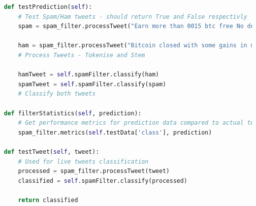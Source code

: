 \documentclass[oneside, 12pt]{article}
\begin{document}
\begin{lstlisting}[language=python, caption=Spam filter training Class - \textit{tweet\_collector.py}]
def testPrediction(self):
	# Test Spam/Ham tweets - should return True and False respectivly
	spam = spam_filter.processTweet("Earn more than 0015 btc free No deposit No investment Free Bitcoins - Earn $65 free btc in 5 minutes bitcoin freebtc getbtc")
			
	ham = spam_filter.processTweet("Bitcoin closed with some gains in month of February")
	# Process Tweets - Tokenise and Stem
					
	hamTweet = self.spamFilter.classify(ham)
	spamTweet = self.spamFilter.classify(spam)
	# Classify both tweets

def filterStatistics(self, prediction):
	# Get performance metrics for prediction data compared to actual test data
	spam_filter.metrics(self.testData['class'], prediction)
			
def testTweet(self, tweet):
	# Used for live tweets classification
	processed = spam_filter.processTweet(tweet)
	classified = self.spamFilter.classify(processed)
	
	return classified
			\end{lstlisting}
		
\end{document}
